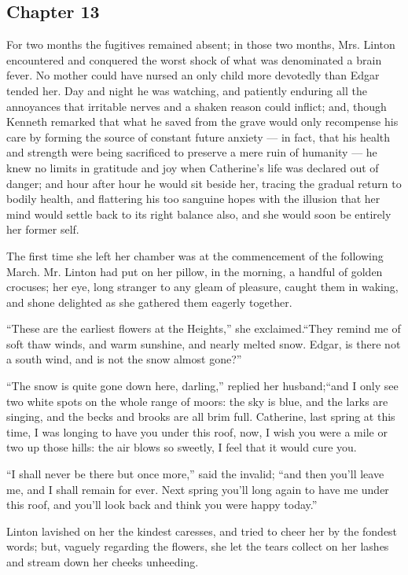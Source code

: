 \subsection*{Chapter 13}

\par For two months the fugitives remained absent; in those two months, Mrs. Linton encountered and conquered the worst shock of what was denominated a brain fever. No mother could have nursed an only child more devotedly than Edgar tended her. Day and night he was watching, and patiently enduring all the annoyances that irritable nerves and a shaken reason could inflict; and, though Kenneth remarked that what he saved from the grave would only recompense his care by forming the source of constant future anxiety — in fact, that his health and strength were being sacrificed to preserve a mere ruin of humanity — he knew no limits in gratitude and joy when Catherine's life was declared out of danger; and hour after hour he would sit beside her, tracing the gradual return to bodily health, and flattering his too sanguine hopes with the illusion that her mind would settle back to its right balance also, and she would soon be entirely her former self.
\par The first time she left her chamber was at the commencement of the following March. Mr. Linton had put on her pillow, in the morning, a handful of golden crocuses; her eye, long stranger to any gleam of pleasure, caught them in waking, and shone delighted as she gathered them eagerly together.
\par “These are the earliest flowers at the Heights,” she exclaimed.“They remind me of soft thaw winds, and warm sunshine, and nearly melted snow. Edgar, is there not a south wind, and is not the snow almost gone?”
\par “The snow is quite gone down here, darling,” replied her husband;“and I only see two white spots on the whole range of moors: the sky is blue, and the larks are singing, and the becks and brooks are all brim full. Catherine, last spring at this time, I was longing to have you under this roof, now, I wish you were a mile or two up those hills: the air blows so sweetly, I feel that it would cure you.
\par “I shall never be there but once more,” said the invalid; “and then you'll leave me, and I shall remain for ever. Next spring you'll long again to have me under this roof, and you'll look back and think you were happy today.”
\par Linton lavished on her the kindest caresses, and tried to cheer her by the fondest words; but, vaguely regarding the flowers, she let the tears collect on her lashes and stream down her cheeks unheeding.
